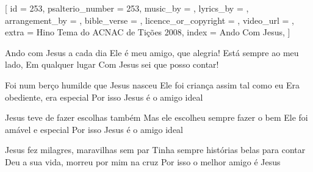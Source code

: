 [
    id                     = {253},
    psalterio_number       = {253},
    music_by               = {},
    lyrics_by              = {},
    arrangement_by         = {},
    bible_verse            = {},
    licence_or_copyright   = {},
    video_url              = {},
    extra                  = {Hino Tema do ACNAC de Tições 2008},
    index                  = {Ando Com Jesus},
]


\beginverse
Ando com Jesus a cada dia 
Ele é meu amigo, que alegria!
Está sempre ao meu lado, 
Em qualquer lugar
Com Jesus sei que posso contar!
\endverse


\beginverse
Foi num berço humilde que Jesus nasceu
Ele foi criança assim tal como eu
Era obediente, era especial
Por isso Jesus é o amigo ideal
\endverse


\beginverse
Jesus teve de fazer escolhas também
Mas ele escolheu sempre fazer o bem
Ele foi amável e especial
Por isso Jesus é o amigo ideal
\endverse


\beginverse
Jesus fez milagres, maravilhas sem par
Tinha sempre histórias belas para contar
Deu a sua vida, morreu por mim na cruz
Por isso o melhor amigo é Jesus
\endverse

\endsong
